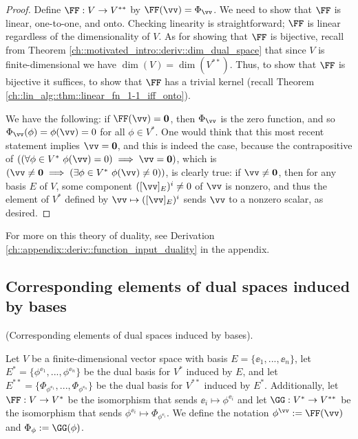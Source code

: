 \begin{proof}
    Define $\FF:V \rightarrow V^{**}$ by $\FF(\vv) = \Phi_\vv$. We need to show that $\FF$ is linear, one-to-one, and onto. Checking linearity is straightforward; $\FF$ is linear regardless of the dimensionality of $V$. As for showing that $\FF$ is bijective, recall from Theorem \ref{ch::motivated_intro::deriv::dim_dual_space} that since $V$ is finite-dimensional we have $\dim(V) = \dim(V^{**})$. Thus, to show that $\FF$ is bijective it suffices, to show that $\FF$ has a trivial kernel (recall Theorem \ref{ch::lin_alg::thm::linear_fn_1-1_iff_onto}).
    
    We have the following: if $\FF(\vv) = \mathbf{0}$, then $\Phi_\vv$ is the zero function, and so $\Phi_\vv(\phi) = \phi(\vv) = 0$ for all $\phi \in V^*$. One would think that this most recent statement implies $\vv = \mathbf{0}$, and this is indeed the case, because the contrapositive of $((\forall \phi \in V^* \spc \phi(\vv) = 0) \implies \vv = \mathbf{0})$, which is $(\vv \neq \mathbf{0} \implies (\exists \phi \in V^* \spc \phi(\vv) \neq 0))$, is clearly true: if $\vv \neq \mathbf{0}$, then for any basis $E$ of $V$, some component $([\vv]_E)^i \neq 0$ of $\vv$ is nonzero, and thus the element of $V^*$ defined by $\vv \mapsto ([\vv]_E)^i$ sends $\vv$ to a nonzero scalar, as desired.
\end{proof}

For more on this theory of duality, see Derivation \ref{ch::appendix::deriv::function_input_duality} in the appendix.

\newpage

\subsection*{Corresponding elements of dual spaces induced by bases}

\begin{defn}
    (Corresponding elements of dual spaces induced by bases).
    
    Let $V$ be a finite-dimensional vector space with basis $E = \{\ee_1, ..., \ee_n\}$, let $E^* = \{\phi^{\ee_1}, ..., \phi^{\ee_n}\}$ be the dual basis for $V^*$ induced by $E$, and let $E^{**} = \{\Phi_{\phi^{\ee_1}}, ..., \Phi_{\phi^{\ee_n}}\}$ be the dual basis for $V^{**}$ induced by $E^*$. Additionally, let $\FF:V \rightarrow V^*$ be the isomorphism that sends $\ee_i \mapsto \phi^{\ee_i}$ and let $\GG:V^* \rightarrow V^{**}$ be the isomorphism that sends $\phi^{\ee_i} \mapsto \Phi_{\phi^{\ee_i}}$. We define the notation $\phi^\vv := \FF(\vv)$ and $\Phi_\phi := \GG(\phi)$.
\end{defn}


